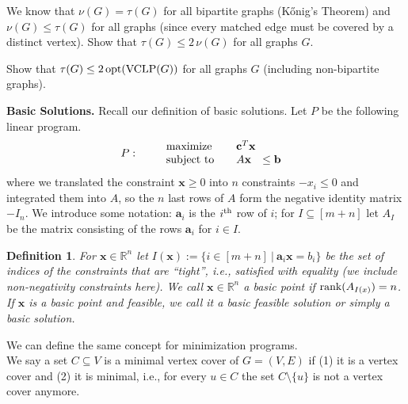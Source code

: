 \documentclass[11pt,a4paper,oneside]{article}
\newtheorem{definition}[theorem]{Definition}
\newcommand{\nth}[1]{#1\textsuperscript{th}}
\newcommand{\R}{\mathbb{R}}
\newcommand{\x}{\mathbf{x}}
\newcommand{\opt}{\textup{\textrm{opt}}}
\newcommand{\rank}{\textnormal{rank}}
\renewcommand{\a}{\mathbf{a}}
\renewcommand{\b}{\mathbf{b}}
\begin{document}
\begin{problem}{2}
  \statement
 We know that $\nu(G) = \tau(G)$ for all bipartite graphs (K\H{o}nig's Theorem) and
 $\nu(G) \leq \tau(G)$ for all graphs (since every matched edge must be covered
 by a distinct vertex). Show that $\tau(G) \leq 2 \, \nu(G)$ for all graphs $G$.   
  
  \solution
  
\end{problem}


\begin{problem}{3}
	\statement
     Show that $\tau(G) \leq 2\, \opt(\textrm{VCLP}(G))$ for all graphs $G$ (including non-bipartite graphs).
  
    \solution
    
\end{problem}



\textbf{Basic Solutions.} Recall our definition of basic solutions.
Let $P$ be the following linear program.
\begin{align*}
P: \qquad
\begin{array}{lrl}
\textnormal{maximize} \quad & \multicolumn{2}{l}{\mathbf{c}^T \x} \\
\textnormal{subject to} \quad & A\x & \leq \b \ 
\end{array}
\end{align*}
where we translated the constraint $\x \geq 0$ into $n$ constraints
$-x_i \leq 0$ and integrated them into $A$, so 
the $n$ last rows of $A$ form the 
negative identity matrix $-I_n$. We introduce some notation: $\a_i$ is the $\nth{i}$ row of $i$;
for $I \subseteq [m+n]$ let $A_I$ be the matrix
consisting of the rows $\a_i$ for $i \in I$.
\begin{definition}
	For $\x \in \R^n$ let $I(\x) := \{i \in [m+n] \ | \ \a_i \x = b_i\}$
	be the set of indices of the constraints that are ``tight'', i.e.,
	satisfied with equality (we include non-negativity constraints here).  We call $\x \in \R^n$ a {\em basic point}
	if $\rank(A_{I(x)}) = n$.  If $\x$ is a basic point and feasible, we
	call it a {\em basic feasible solution} or simply a {\em basic
		solution}.
\end{definition}
We can define the same concept for minimization programs. \\

We say a set $C \subseteq V$ is a minimal vertex cover of $G = (V,E)$ if 
(1) it is a vertex cover and (2) it is minimal, i.e., for every $u \in C$ the set
$C \setminus \{u\}$ is not a vertex cover anymore.
\end{document}
